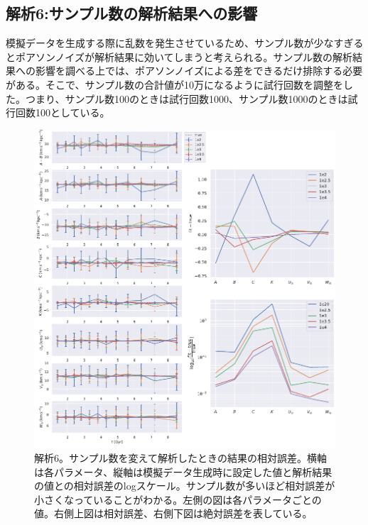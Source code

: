 
\subsection{解析6:サンプル数の解析結果への影響 \label{new_N}}
模擬データを生成する際に乱数を発生させているため、サンプル数が少なすぎるとポアソンノイズが解析結果に効いてしまうと考えられる。サンプル数の解析結果への影響を調べる上では、ポアソンノイズによる差をできるだけ排除する必要がある。そこで、サンプル数の合計値が10万になるように試行回数を調整をした。つまり、サンプル数100のときは試行回数1000、サンプル数1000のときは試行回数100としている。
\begin{figure}[htbp]
	\centering
	\includegraphics[width=15cm]{fig/Mock_N.pdf}
	\caption{解析6。サンプル数を変えて解析したときの結果の相対誤差。横軸は各パラメータ、縦軸は模擬データ生成時に設定した値と解析結果の値との相対誤差のlogスケール。サンプル数が多いほど相対誤差が小さくなっていることがわかる。左側の図は各パラメータごとの値。右側上図は相対誤差、右側下図は絶対誤差を表している。} \label{fig:Mock_N}
\end{figure}

